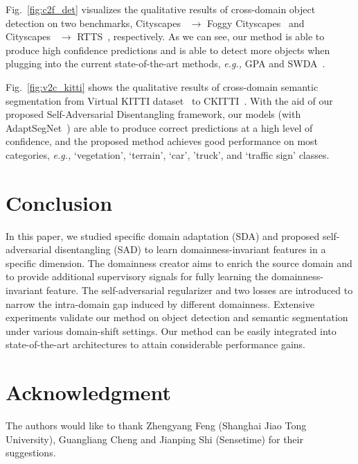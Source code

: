 \documentclass[10pt,journal,compsoc]{IEEEtran}
\begin{document}
Fig.~\ref{fig:c2f_det} visualizes the qualitative results of cross-domain object detection on two benchmarks, Cityscapes~\cite{cordts2016cityscapes} $\rightarrow$ Foggy Cityscapes~\cite{FoggyCity} and Cityscapes~\cite{cordts2016cityscapes} $\rightarrow$ RTTS~\cite{RTTS}, respectively. As we can see, our method is able to produce high confidence predictions and is able to detect more objects when plugging into the current state-of-the-art methods, \emph{e.g.,} GPA and SWDA~\cite{SWDA}.

Fig.~\ref{fig:v2c_kitti} shows the qualitative results of cross-domain semantic segmentation from Virtual KITTI dataset~\cite{VKITTI} to CKITTI~\cite{kITTI,cordts2016cityscapes}. With the aid of our proposed Self-Adversarial Disentangling framework,  our models (with AdaptSegNet~\cite{AdaptSegNet}) are able to produce correct predictions at a high level of confidence, and the proposed method achieves good performance on most categories, \emph{e.g.,} ‘vegetation’, ‘terrain’, ‘car’, 'truck', and ‘traffic sign’ classes. 

 

\section{Conclusion}
In this paper, we studied specific domain adaptation (SDA) and proposed self-adversarial disentangling (SAD) to learn domainness-invariant features in a specific dimension. The domainness creator aims to enrich the source domain and to provide additional supervisory signals for fully learning the domainness-invariant feature. The self-adversarial regularizer and two losses are introduced to narrow the intra-domain gap induced by different domainness. Extensive experiments validate our method on object detection and semantic segmentation under various domain-shift settings. Our method can be easily integrated into state-of-the-art architectures to attain considerable performance gains. 



\section*{Acknowledgment}
The authors would like to thank Zhengyang Feng (Shanghai Jiao Tong University), Guangliang Cheng and Jianping Shi (Sensetime) for their suggestions.




\ifCLASSOPTIONcaptionsoff
  \newpage
\fi










\vspace{-1cm}
\end{document}
